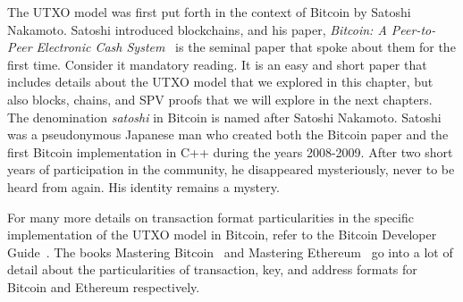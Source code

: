 The UTXO model was first put forth in the context of Bitcoin by Satoshi Nakamoto. Satoshi
introduced blockchains, and his paper, \emph{Bitcoin: A Peer-to-Peer Electronic Cash System}~\cite{bitcoin} is
the seminal paper that spoke about them for the first time. Consider it mandatory reading.
It is an easy and short paper that includes details about the UTXO model that we explored
in this chapter, but also blocks, chains, and SPV proofs that we will explore in the next chapters.
The denomination \emph{satoshi} in Bitcoin is named after Satoshi Nakamoto. Satoshi was a pseudonymous Japanese man
who created both the Bitcoin paper and the first Bitcoin implementation in C++ during the years
2008-2009. After two short years of participation in the community, he disappeared mysteriously, never
to be heard from again. His identity remains a mystery.

For many more details on transaction format particularities in the specific implementation of the UTXO
model in Bitcoin, refer to the Bitcoin Developer Guide~\cite{bitcoin-dev-guide}.
The books Mastering Bitcoin~\cite{mastering-bitcoin} and Mastering Ethereum~\cite{mastering-ethereum}
go into a lot of detail about the particularities of transaction, key, and address formats
for Bitcoin and Ethereum respectively.

